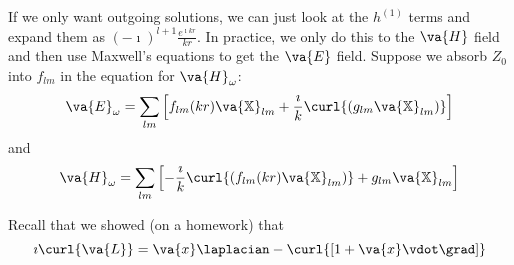 \documentclass[a4paper,twoside,master.tex]{subfiles}
\begin{document}
If we only want outgoing solutions, we can just look at the $ h^{(1)} $ terms and expand them as $ (- \imath)^{l+1} \frac{e^{\imath kr}}{kr} $. In practice, we only do this to the $ \va{H} $ field and then use Maxwell's equations to get the $ \va{E} $ field. Suppose we absorb $ Z_0 $ into $ f_{lm} $ in the equation for $ \va{H}_{\omega} $:
\begin{equation}
    \va{E}_{\omega} = \sum_{lm} \left[ f_{lm}(kr) \va{\mathbb{X}}_{lm} + \frac{\imath}{k} \curl{(g_{lm} \va{\mathbb{X}}_{lm})} \right]
\end{equation}
and
\begin{equation}
    \va{H}_{\omega} = \sum_{lm} \left[ - \frac{\imath}{k} \curl{(f_{lm}(kr) \va{\mathbb{X}}_{lm})} + g_{lm} \va{\mathbb{X}}_{lm} \right]
\end{equation}

Recall that we showed (on a homework) that
\begin{equation}
    \imath \curl{ \va{L}} = \va{x} \laplacian - \curl{[1+ \va{x} \vdot \grad]}
\end{equation}
\end{document}

